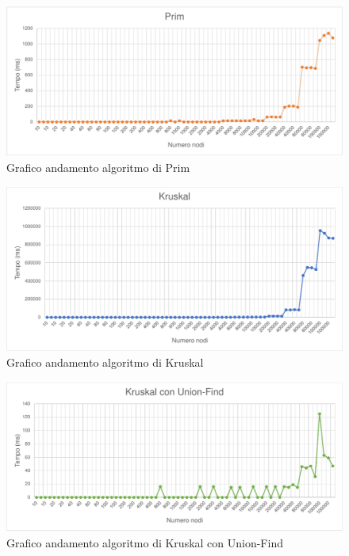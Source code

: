\documentclass[a4paper]{article}
\begin{document}
\newpage
\begin{figure}[H]
\centering
\includegraphics[scale=1]{grafici/prim.pdf}
\caption{Grafico andamento algoritmo di Prim}
\end{figure}

\begin{figure}[H]
\centering
\includegraphics[scale=1]{grafici/kruskal.pdf}
\caption{Grafico andamento algoritmo di Kruskal}
\end{figure}

\begin{figure}[H]
\centering
\includegraphics[scale=1]{grafici/kruskaluf.pdf}
\caption{Grafico andamento algoritmo di Kruskal con Union-Find}
\end{figure}
\newpage

\end{document}
